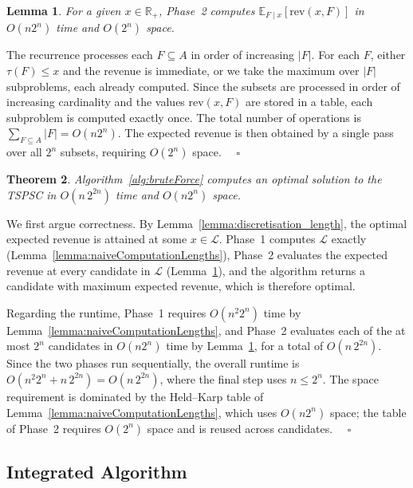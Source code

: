 \documentclass[11pt]{article}
\theoremstyle{plain}
\newtheorem{theorem}{Theorem}
\newtheorem{lemma}[theorem]{Lemma}
\theoremstyle{definition}
\renewenvironment{proof}[1]{\par\noindent{\itshape #1}\space\ignorespaces}{\par\medskip}
\newcommand{\Halmos}{\ensuremath{\quad\square}}
\begin{document}
	\begin{lemma}\label{lemma:naiveExpectedRev}
		For a given $x \in \mathbb{R}_+$, Phase~2 computes $\mathbb{E}_{F\mid x}[\text{rev}(x, F)]$ in $O(n 2^n)$ time and  $O(2^n)$ space.
	\end{lemma}
	\begin{proof}{Proof.}
		The recurrence processes each $F \subseteq A$ in order of increasing $|F|$. 
		For each $F$, either $\tau(F) \leq x$ and the revenue is immediate, or we take the maximum over $|F|$ subproblems, each already computed.
		Since the subsets are processed in order of increasing cardinality and the 
		values $\text{rev}(x, F)$ are stored in a table, each subproblem is computed 
		exactly once.
		The total number of operations is $\sum_{F \subseteq A} |F| = O(n 2^n)$. The expected revenue is then obtained by a single pass over all $2^n$ subsets, requiring $O(2^n)$ space.
	\Halmos
\end{proof}
	
	\begin{theorem}\label{thm:opt1}
		Algorithm~\ref{alg:bruteForce} computes an optimal solution to the \ac{TSPSC} in $O(n\,2^{2n})$ time and $O(n 2^n)$ space.
	\end{theorem}
	\begin{proof}{Proof.}
		We first argue correctness. By Lemma~\ref{lemma:discretisation_length}, the optimal expected revenue is attained at some $x \in \mathcal{L}$. Phase~1 computes $\mathcal{L}$ exactly (Lemma~\ref{lemma:naiveComputationLengths}), Phase~2 evaluates the expected revenue at every candidate in $\mathcal{L}$ (Lemma~\ref{lemma:naiveExpectedRev}), and the algorithm returns a candidate with maximum expected revenue, which is therefore optimal.

		Regarding the runtime, Phase~1 requires $O(n^2 2^n)$ time by Lemma~\ref{lemma:naiveComputationLengths}, and Phase~2 evaluates each of the at most $2^n$ candidates in $O(n 2^n)$ time by Lemma~\ref{lemma:naiveExpectedRev}, for a total of $O(n\,2^{2n})$. Since the two phases run sequentially, the overall runtime is $O(n^2 2^n + n\,2^{2n}) = O(n\,2^{2n})$, where the final step uses $n \leq 2^n$. The space requirement is dominated by the Held--Karp table of Lemma~\ref{lemma:naiveComputationLengths}, which uses $O(n 2^n)$ space; the table of Phase~2 requires $O(2^n)$ space and is reused across candidates.
	\Halmos
\end{proof}

    \subsection{Integrated Algorithm}\label{sec:integrated}
	
\end{document}
